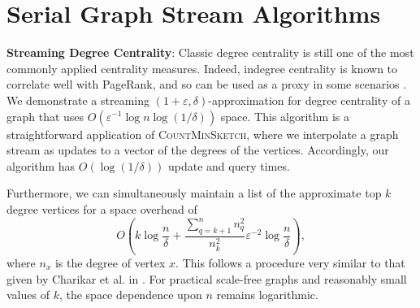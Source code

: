 \documentclass{report}
\newcommand{\algoname}[1]{\textnormal{\textsc{#1}}}
\begin{document}
\section{Serial Graph Stream Algorithms} \label{intro:sec:serial_streaming}

\textbf{Streaming Degree Centrality}:
Classic degree centrality is still one of the most commonly applied centrality measures.
%
Indeed, indegree centrality is known to correlate well with PageRank, and so can be used as a proxy in some scenarios \cite{upstill2003predicting}.
We demonstrate a streaming $(1+\varepsilon, \delta)$-approximation for degree centrality of a graph that uses $O(\varepsilon^{-1} \log n \log (1/ \delta))$ space.
This algorithm is a straightforward application of \algoname{CountMinSketch}, where we interpolate a graph stream as updates to a vector of the degrees of the vertices.
Accordingly, our algorithm has $O(\log (1/ \delta))$ update and query times.

Furthermore, we can simultaneously maintain a list of the approximate top $k$ degree vertices for a space overhead of
%
\begin{equation} \label{eq:dc:space}
O \left (
k \log \frac{n}{\delta}
+ 
\frac{\sum_{q = k+1}^n n_q^2}{n_k^2}
\varepsilon^{-2}
\log \frac{n}{\delta}
\right ),
\end{equation}
%
where $n_x$ is the degree of vertex $x$.
This follows a procedure very similar to that given by Charikar et al. in \cite{charikar2002finding}.
For practical scale-free graphs and reasonably small values of $k$, the space dependence upon $n$ remains logarithmic.
\end{document}
